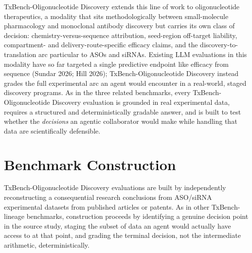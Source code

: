 \documentclass[11pt]{article}
\begin{document}
TxBench-Oligonucleotide Discovery extends this line of work to oligonucleotide therapeutics, a modality that sits methodologically between small-molecule pharmacology and monoclonal antibody discovery but carries its own class of decision: chemistry-versus-sequence attribution, seed-region off-target liability, compartment- and delivery-route-specific efficacy claims, and the discovery-to-translation arc particular to ASOs and siRNAs. Existing LLM evaluations in this modality have so far targeted a single predictive endpoint like efficacy from sequence (Sundar 2026; Hill 2026); TxBench-Oligonucleotide Discovery instead grades the full experimental arc an agent would encounter in a real-world, staged discovery programs. As in the three related benchmarks, every TxBench-Oligonucleotide Discovery evaluation is grounded in real experimental data, requires a structured and deterministically gradable answer, and is built to test whether the \textit{decisions} an agentic collaborator would make while handling that data are scientifically defensible. 
\section{Benchmark Construction}
\enlargethispage{\baselineskip}
TxBench-Oligonucleotide Discovery evaluations are built by independently reconstructing a consequential research conclusions from ASO/siRNA experimental datasets from published articles or patents. As in other  TxBench-lineage benchmarks, construction proceeds by identifying a genuine decision point in the source study, staging the subset of data an agent would actually have access to at that point, and grading the terminal decision, not the intermediate arithmetic, deterministically.
\end{document}
